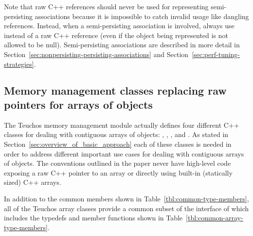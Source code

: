 \documentclass[pdf,ps2pdf,11pt]{SANDreport}
\begin{document}
Note that raw C++ references should never be used for representing
semi-persisting associations because it is impossible to catch invalid
usage like dangling references.  Instead, when a semi-persisting
association is involved, always use {} instead of a raw C++
reference (even if the object being represented is not allowed to be
null).  Semi-persisting associations are described in more detail in
Section~\ref{sec:nonpersisting-persisting-associations} and
Section~\ref{sec:perf-tuning-strategies}.


%
{}\subsection{Memory management classes replacing raw pointers for
arrays of objects}
\label{sec:array-classes}
%

The Teuchos memory management module actually defines four different
C++ classes for dealing with contiguous arrays of objects:
{}, {}, {}, and {}.
As stated in Section~\ref{sec:overview_of_basic_approach} each of
these classes is needed in order to address different important use
cases for dealing with contiguous arrays of objects.  The conventions
outlined in the paper never have high-level code exposing a raw C++
pointer to an array or directly using built-in (statically sized) C++
arrays.

In addition to the common members shown in
Table~\ref{tbl:common-type-members}, all of the Teuchos array classes
provide a common subset of the interface of {} which
includes the typedefs and member functions shown in
Table~\ref{tbl:common-array-type-members}.
\end{document}
